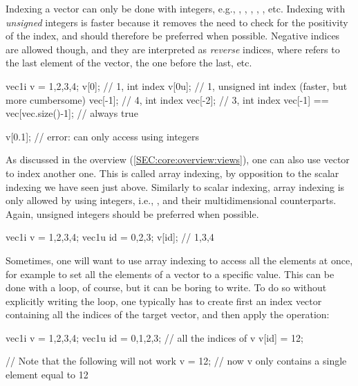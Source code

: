 \documentclass[12pt]{report}
\newenvironment{example}
{
    \begin{mdframed}[style=example,frametitle={Example}]
}
{
    \end{mdframed}
}
\begin{document}
Indexing a vector can only be done with integers, e.g., , , , , , etc. Indexing with \emph{unsigned} integers is faster because it removes the need to check for the positivity of the index, and should therefore be preferred when possible. Negative indices are allowed though, and they are interpreted as \emph{reverse} indices, where  refers to the last element of the vector,  the one before the last, etc.

\begin{example}
\begin{cppcode}
vec1i v = {1,2,3,4};
v[0];    // 1, int index
v[0u];   // 1, unsigned int index (faster, but more cumbersome)
vec[-1]; // 4, int index
vec[-2]; // 3, int index
vec[-1] == vec[vec.size()-1]; // always true

v[0.1]; // error: can only access using integers
\end{cppcode}
\end{example}

As discussed in the overview (\ref{SEC:core:overview:views}), one can also use  vector to index another one. This is called array indexing, by opposition to the scalar indexing we have seen just above. Similarly to scalar indexing, array indexing is only allowed by using integers, i.e., ,  and their multidimensional counterparts. Again, unsigned integers should be preferred when possible.

\begin{example}
\begin{cppcode}
vec1i v = {1,2,3,4};
vec1u id = {0,2,3};
v[id]; // 1,3,4
\end{cppcode}
\end{example}

Sometimes, one will want to use array indexing to access all the elements at once, for example to set all the elements of a vector to a specific value. This can be done with a loop, of course, but it can be boring to write. To do so without explicitly writing the loop, one typically has to create first an index vector containing all the indices of the target vector, and then apply the operation:

\begin{cppcode}
vec1i v = {1,2,3,4};
vec1u id = {0,1,2,3}; // all the indices of v
v[id] = 12;

// Note that the following will not work
v = 12; // now v only contains a single element equal to 12
\end{cppcode}
\end{document}
